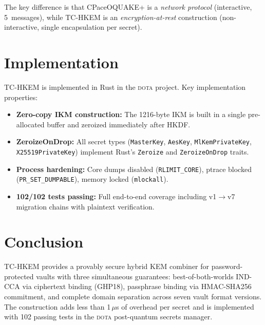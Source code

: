\documentclass[11pt,a4paper]{article}
\begin{document}
The key difference is that CPaceOQUAKE+ is a \emph{network protocol}
(interactive, 5~messages), while TC-HKEM is an \emph{encryption-at-rest}
construction (non-interactive, single encapsulation per secret).

\section{Implementation}\label{sec:impl}

TC-HKEM is implemented in Rust in the \textsc{dota} project. Key
implementation properties:

\begin{itemize}[nosep]
\item \textbf{Zero-copy IKM construction:} The 1216-byte IKM is built
in a single pre-allocated buffer and zeroized immediately after HKDF.
\item \textbf{ZeroizeOnDrop:} All secret types (\texttt{MasterKey},
\texttt{AesKey}, \texttt{MlKemPrivateKey}, \texttt{X25519PrivateKey})
implement Rust's \texttt{Zeroize} and \texttt{ZeroizeOnDrop} traits.
\item \textbf{Process hardening:} Core dumps disabled
(\texttt{RLIMIT\_CORE}), ptrace blocked
(\texttt{PR\_SET\_DUMPABLE}), memory locked (\texttt{mlockall}).
\item \textbf{102/102 tests passing:} Full end-to-end coverage
including v1$\to$v7 migration chains with plaintext verification.
\end{itemize}

\section{Conclusion}

TC-HKEM provides a provably secure hybrid KEM combiner for
password-protected vaults with three simultaneous guarantees:
best-of-both-worlds IND-CCA via ciphertext binding (GHP18),
passphrase binding via HMAC-SHA256 commitment, and complete
domain separation across seven vault format versions. The
construction adds less than 1\,$\mu$s of overhead per secret
and is implemented with 102 passing tests in the \textsc{dota}
post-quantum secrets manager.
\end{document}
